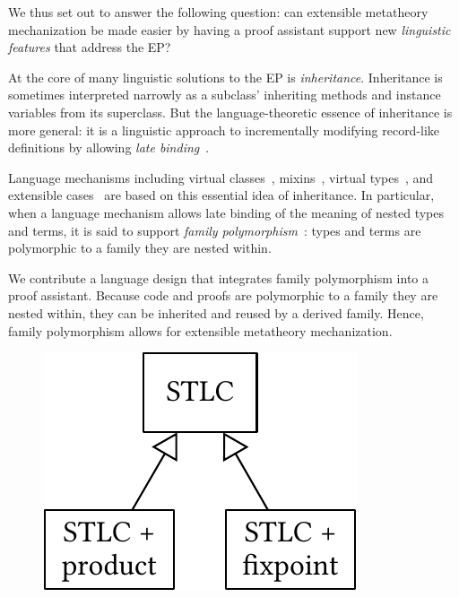 We thus set out to answer the following question:
can extensible metatheory mechanization be made easier by
having a proof assistant support new \emph{linguistic features} that address the EP?

At the core of many linguistic solutions to the EP is \emph{inheritance}.
Inheritance is sometimes interpreted narrowly as a subclass'
inheriting methods and instance variables from its superclass.
But the language-theoretic essence of inheritance is more general:
it is a linguistic approach to incrementally modifying
record-like definitions by allowing \emph{late binding}~\cite{cook1990inheritance}.

Language mechanisms including
virtual classes~\cite{virtualclasses-1989,vc-calculus-2006},
mixins~\cite{mixin-1990},
virtual types~\cite{thorup97}, %
and extensible cases~\cite{bac2006}
are based on this essential idea of inheritance.
%
In particular, when a language mechanism allows late binding of the
meaning of nested types and terms,
it is said to support \emph{family polymorphism}~\cite{ernst2001family}:
types and terms are polymorphic to a family they are nested within.


We contribute a language design that integrates family polymorphism into
a proof assistant.
Because code and proofs are polymorphic to a family they are nested
within, they can be
inherited and reused by a derived family.
Hence, family polymorphism allows for extensible metatheory mechanization.

\begingroup

\begin{figure}
\includegraphics[scale=.48]{graphics/stlc-intro.pdf}
\end{figure}

